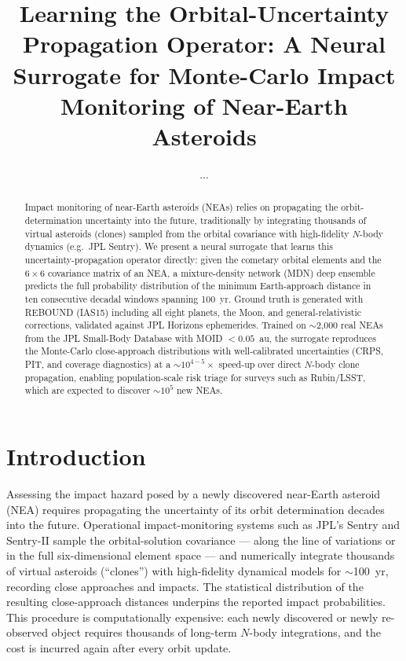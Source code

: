 \documentclass[twocolumn]{aastex631}
\begin{document}
\title{Learning the Orbital-Uncertainty Propagation Operator: A Neural
Surrogate for Monte-Carlo Impact Monitoring of Near-Earth Asteroids}

\author{...}

\begin{abstract}
Impact monitoring of near-Earth asteroids (NEAs) relies on propagating the
orbit-determination uncertainty into the future, traditionally by integrating
thousands of virtual asteroids (clones) sampled from the orbital covariance
with high-fidelity $N$-body dynamics (e.g.\ JPL Sentry). We present a neural
surrogate that learns this uncertainty-propagation operator directly: given the
cometary orbital elements and the $6\times6$ covariance matrix of an NEA, a
mixture-density network (MDN) deep ensemble predicts the full probability
distribution of the minimum Earth-approach distance in ten consecutive
decadal windows spanning 100~yr. Ground truth is generated with REBOUND
(IAS15) including all eight planets, the Moon, and general-relativistic
corrections, validated against JPL Horizons ephemerides. Trained on
$\sim$2{,}000 real NEAs from the JPL Small-Body Database with MOID
$<0.05$~au, the surrogate reproduces the Monte-Carlo close-approach
distributions with well-calibrated uncertainties (CRPS, PIT, and coverage
diagnostics) at a $\sim$$10^{4-5}\times$ speed-up over direct $N$-body clone
propagation, enabling population-scale risk triage for surveys such as
Rubin/LSST, which are expected to discover $\sim$$10^5$ new NEAs.
\end{abstract}


\section{Introduction}

Assessing the impact hazard posed by a newly discovered near-Earth asteroid
(NEA) requires propagating the uncertainty of its orbit determination decades
into the future. Operational impact-monitoring systems such as JPL's Sentry
and Sentry-II \citep{Milani2005, Roa2021} sample the orbital-solution
covariance --- along the line of variations or in the full six-dimensional
element space --- and numerically integrate thousands of virtual asteroids
(``clones'') with high-fidelity dynamical models for $\sim$100~yr, recording
close approaches and impacts. The statistical distribution of the resulting
close-approach distances underpins the reported impact probabilities. This
procedure is computationally expensive: each newly discovered or newly
re-observed object requires thousands of long-term $N$-body integrations,
and the cost is incurred again after every orbit update.
\end{document}
